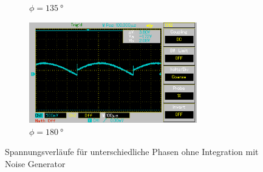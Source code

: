 \begin{figure}[H]
\begin{subfigure}{0.5\textwidth}
    \caption{$\phi = \qty[]{135}{\degree}$}%
    \label{fig:phase9}%
    \end{subfigure}%
    \hfill
    \begin{subfigure}{0.5\textwidth}%
    \centering%
    \includegraphics[width = 7.3cm]{./Oszilloskop Bilder/png/5.3/n5.png}%
    \caption{$\phi = \qty[]{180}{\degree}$}%
    \label{fig:phase10}%
    \end{subfigure}%
    \caption{Spannungsverläufe für unterschiedliche Phasen ohne Integration mit Noise Generator}%
    \label{fig:phasenunterschiede_mit_noise}%
\end{figure}%


